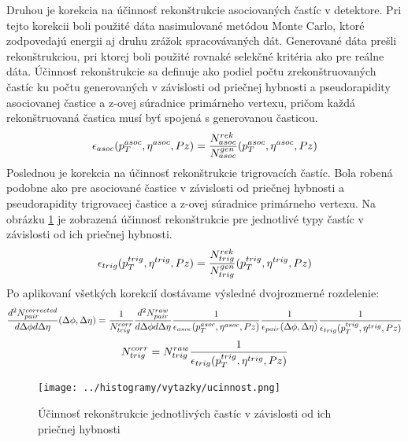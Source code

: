 \documentclass[thesismargins, thesislinespacing]{rnthesis}
\begin{document}
Druhou je korekcia na účinnosť rekonštrukcie asociovaných častíc v detektore. Pri tejto korekcii boli použité dáta nasimulované metódou Monte Carlo, ktoré zodpovedajú energii aj druhu zrážok spracovávaných dát. Generované dáta prešli \-re\-kon\-štruk\-ciou, pri ktorej boli použité rovnaké selekčné kritéria ako pre reálne dáta. Účinnosť re\-kon\-štruk\-cie sa definuje ako podiel počtu zrekonštruovaných častíc ku počtu generovaných v závislosti od priečnej hybnosti a  pseudorapidity asociovanej častice a z-ovej súradnice primárneho vertexu, pričom každá rekonštruovaná častica musí byť spojená s generovanou časticou.  
\begin{equation}
\footnotesize
\epsilon_{asoc}(p_{T}^{asoc},\eta^{asoc},Pz) = \frac{N_{asoc}^{rek}}{N_{asoc}^{gen}}(p_{T}^{asoc},\eta^{asoc},Pz)
\end{equation}
Poslednou je korekcia na účinnosť rekonštrukcie trigrovacích častíc. Bola robená podobne ako pre asociované častice v závislosti od priečnej hybnosti a  pseudorapidity trigrovacej častice a z-ovej súradnice primárneho vertexu. Na obrázku \ref{uc} je zobrazená účinnosť rekonštrukcie pre jednotlivé typy častíc v závislosti od ich priečnej hybnosti.
\begin{equation}
\footnotesize
\epsilon_{trig}(p_{T}^{trig},\eta^{trig},Pz) = \frac{N_{trig}^{rek}}{N_{trig}^{gen}}(p_{T}^{trig},\eta^{trig},Pz)
\end{equation}
\begin{equation}\end{equation}
Po aplikovaní všetkých korekcií dostávame výsledné dvojrozmerné rozdelenie:
\begin{equation}
\footnotesize
\frac{d^2N^{corrected}_{pair}}{d\Delta\phi d\Delta\eta}(\Delta\phi,\Delta \eta)=
\frac{1}{N^{corr}_{trig}} \frac{d^2N^{raw}_{pair}}{d\Delta\phi d\Delta\eta} \frac{1}{\epsilon_{asoc}(p_{T}^{asoc},\eta^{asoc},Pz)}\frac{1}{\epsilon_{pair}(\Delta\phi,\Delta\eta)}
\frac{1}{\epsilon_{trig}(p_{T}^{trig},\eta^{trig},Pz)}
\end{equation}
\begin{equation}
\footnotesize
N^{corr}_{trig}=N^{raw}_{trig}\frac{1}{\epsilon_{trig}(p_{T}^{trig},\eta^{trig},Pz)}
\end{equation}

\begin{figure}[hbtp!]
	\centering
	\texttt{[image: ../histogramy/vytazky/ucinnost.png]}
	\caption{Účinnosť rekonštrukcie jednotlivých častíc v závislosti od ich priečnej hybnosti}
	\label{uc}
\end{figure}
\end{document}
